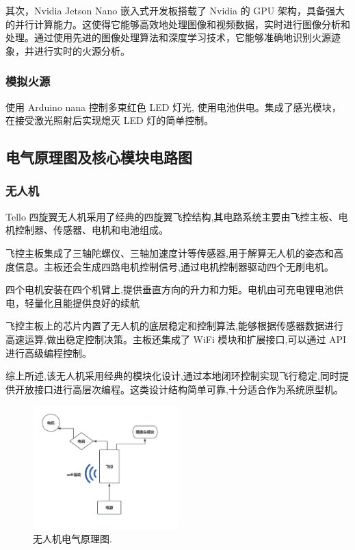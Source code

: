\documentclass[12pt, a4paper, oneside]{article}
\begin{document}
其次，Nvidia Jetson Nano 嵌入式开发板搭载了 Nvidia 的 GPU 架构，具备强大的并行计算能力。这使得它能够高效地处理图像和视频数据，实时进行图像分析和处理。通过使用先进的图像处理算法和深度学习技术，它能够准确地识别火源迹象，并进行实时的火源分析。

\subsubsection{模拟火源}

使用 Arduino nana 控制多束红色 LED 灯光, 使用电池供电。集成了感光模块，在接受激光照射后实现熄灭 LED 灯的简单控制。

\subsection{电气原理图及核心模块电路图}

\subsubsection{无人机}


Tello 四旋翼无人机采用了经典的四旋翼飞控结构,其电路系统主要由飞控主板、电机控制器、传感器、电机和电池组成。

飞控主板集成了三轴陀螺仪、三轴加速度计等传感器,用于解算无人机的姿态和高度信息。主板还会生成四路电机控制信号,通过电机控制器驱动四个无刷电机。

四个电机安装在四个机臂上,提供垂直方向的升力和力矩。电机由可充电锂电池供电，轻量化且能提供良好的续航

飞控主板上的芯片内置了无人机的底层稳定和控制算法,能够根据传感器数据进行高速运算,做出稳定控制决策。主板还集成了 WiFi 模块和扩展接口,可以通过 API 进行高级编程控制。

综上所述,该无人机采用经典的模块化设计,通过本地闭环控制实现飞行稳定,同时提供开放接口进行高层次编程。这类设计结构简单可靠,十分适合作为系统原型机。

\begin{figure}[H]
    \centering
    \includegraphics[width=0.5\textwidth]{image-1.png}
    \caption{无人机电气原理图.}
    \label{无人机电气原理图}
\end{figure}
\end{document}
